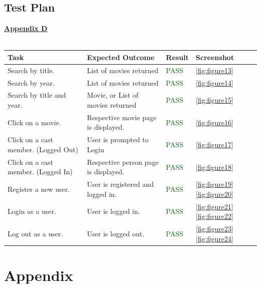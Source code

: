 \documentclass[12pt,a4paper]{article}
\begin{document}
		\subsection{Test Plan}
			\hyperref[subsec:appendixD]{\textbf{Appendix D}}\\
			\\
			\begin{tabular}{|p{}|p{}|p{}|p{}|}
				\hline
				\rowcolor{gray!30}
				\textbf{Task} & 
				\textbf{Expected Outcome} & 
				\textbf{Result} & 
				\textbf{Screenshot} \\
				\hline
				Search by title. & 
				List of movies returned & 
				\textcolor{darkgreen}{PASS} & 
				\cref{fig:figure13} \\
				\hline
				Search by year. & 
				List of movies returned & 
				\textcolor{darkgreen}{PASS} & 
				\cref{fig:figure14} \\
				\hline
				Search by title and year. &
				Movie, or List of movies returned & 
				\textcolor{darkgreen}{PASS} &
				\cref{fig:figure15} \\
				\hline
				Click on a movie. &
				Respective movie page is displayed. &
				\textcolor{darkgreen}{PASS} &
				\cref{fig:figure16} \\
				\hline
				Click on a cast member.
				(Logged Out) &
				User is prompted to Login &
				\textcolor{darkgreen}{PASS} &
				\cref{fig:figure17} \\
				\hline
				Click on a cast member.
				(Logged In) &
				Respective person page is displayed. &
				\textcolor{darkgreen}{PASS} &
				\cref{fig:figure18} \\
				\hline
				Register a new user. &
				User is registered and logged in. &
				\textcolor{darkgreen}{PASS} &
				\cref{fig:figure19} 
				\cref{fig:figure20} \\
				\hline
				Login as a user. &
				User is logged in. &
				\textcolor{darkgreen}{PASS} &
				\cref{fig:figure21}
				\cref{fig:figure22} \\
				\hline
				Log out as a user. &
				User is logged out. &
				\textcolor{darkgreen}{PASS} &
				\cref{fig:figure23} 
				\cref{fig:figure24} \\
				\hline
			\end{tabular}
	
	\newpage

	\section{Appendix}
\end{document}

